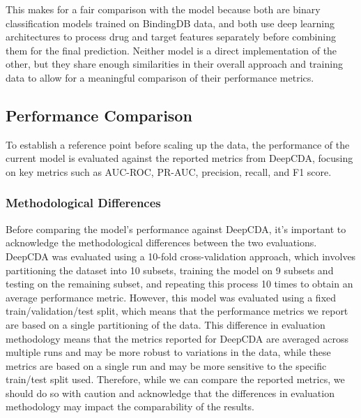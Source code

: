 This makes for a fair comparison with the model because both are binary classification models trained on BindingDB data, and both use deep learning architectures to process drug and target features separately before combining them for the final prediction.
Neither model is a direct implementation of the other, but they share enough similarities in their overall approach and training data to allow for a meaningful comparison of their performance metrics.

\subsection{Performance Comparison}
To establish a reference point before scaling up the data, the performance of the current model is evaluated against the reported metrics from DeepCDA, focusing on key metrics such as AUC-ROC, PR-AUC, precision, recall, and F1 score.

\subsubsection{Methodological Differences}
Before comparing the model's performance against DeepCDA, it's important to acknowledge the methodological differences between the two evaluations.
DeepCDA was evaluated using a 10-fold cross-validation approach, which involves partitioning the dataset into 10 subsets, training the model on 9 subsets and testing on the remaining subset, and repeating this process 10 times to obtain an average performance metric.
However, this model was evaluated using a fixed train/validation/test split, which means that the performance metrics we report are based on a single partitioning of the data.
This difference in evaluation methodology means that the metrics reported for DeepCDA are averaged across multiple runs and may be more robust to variations in the data, while these metrics are based on a single run and may be more sensitive to the specific train/test split used.
Therefore, while we can compare the reported metrics, we should do so with caution and acknowledge that the differences in evaluation methodology may impact the comparability of the results.


